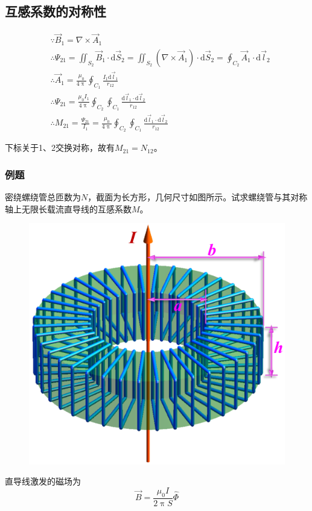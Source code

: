 \documentclass[12pt]{article}
\newcommand{\rmd}{\mathrm{d}}
\begin{document}
\subsection{互感系数的对称性}

\begin{equation*}
    \begin{aligned}
        & \because \overrightarrow{B}_1 = \nabla \times \overrightarrow{A}_1 \\
        & \therefore \varPsi_{21}=\iint_{S_2} \overrightarrow{B}_1 \cdot \rmd \overrightarrow{S}_2=\iint_{S_2}\left(\nabla \times \overrightarrow{A}_1\right) \cdot \rmd \overrightarrow{S}_2=\oint_{C_2} \overrightarrow{A}_1 \cdot \rmd \overrightarrow{l}_2 \\
        & \therefore \overrightarrow{A}_1=\frac{\mu_0}{4 \uppi} \oint_{C_1} \frac{I_1 \rmd \overrightarrow{l}_1}{r_{12}} \\
        & \therefore \varPsi_{21}=\frac{\mu_0 I_1}{4 \uppi} \oint_{C_2} \oint_{C_1} \frac{\rmd \overrightarrow{l}_1 \cdot \rmd \overrightarrow{l}_2}{r_{12}} \\
        & \therefore M_{21}=\frac{\Psi_{21}}{I_1}=\frac{\mu_0}{4 \uppi} \oint_{C_2} \oint_{C_1} \frac{\rmd \vec{l}_1 \cdot \rmd \vec{l}_2}{r_{12}}
    \end{aligned}
\end{equation*}

下标关于1、2交换对称，故有\(M_{21} = N_{12}\)。

\subsubsection{例题}

密绕螺绕管总匝数为\(N\)，截面为长方形，几何尺寸如图所示。试求螺绕管与其对称轴上无限长载流直导线的互感系数\(M\)。

\begin{figure}[!h]
    \centering
    \includegraphics[width = .25\textwidth]{graphics/互感例题.png}
\end{figure}

直导线激发的磁场为
\[
\overrightarrow{B} = \frac{\mu_0 I}{2 \uppi S} \hat{\varPhi}
\]
\end{document}
